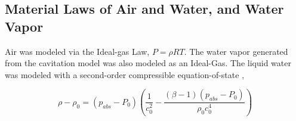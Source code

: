 \documentclass{UCF_ETD}
\begin{document}



\subsection{Material Laws of Air and Water, and Water Vapor}
\label{sec:materials}
Air was modeled via the Ideal-gas Law, $P = \rho R T$. The water vapor generated from the cavitation model was also modeled as an Ideal-Gas. The liquid water was modeled with a second-order compressible equation-of-state \cite{hamilton2008nonlinear},

\begin{equation}
    \rho - \rho_{0} = \left( p_{abs} - P_{0} \right) \left( \frac{1}{c_{0}^{2}} - \frac{\left( \beta - 1 \right) \left( p_{abs} - P_{0} \right) }{\rho_{0} c_{0}^{4}} \right)
    \label{eq:waterEOS}
\end{equation}
\end{document}
